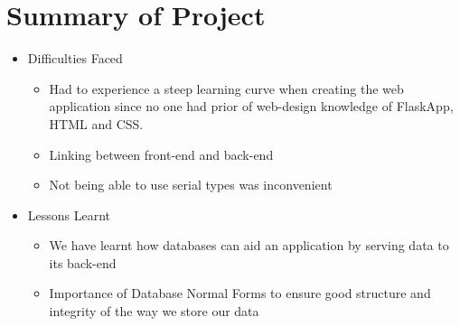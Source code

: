 \documentclass[10pt]{article}
\begin{document}
\newpage


\section{Summary of Project}
    \begin{itemize}
        \item Difficulties Faced
        \begin{itemize}
            \item Had to experience a steep learning curve when creating the web application since no one had prior of web-design knowledge of FlaskApp, HTML and CSS.
            \item Linking between front-end and back-end  
            \item Not being able to use serial types was inconvenient
        \end{itemize}
        \item Lessons Learnt
        \begin{itemize}
            \item We have learnt how databases can aid an application by serving data to its back-end
            \item Importance of Database Normal Forms to ensure good structure and integrity of the way we store our data
        \end{itemize}
    \end{itemize}
\end{document}
